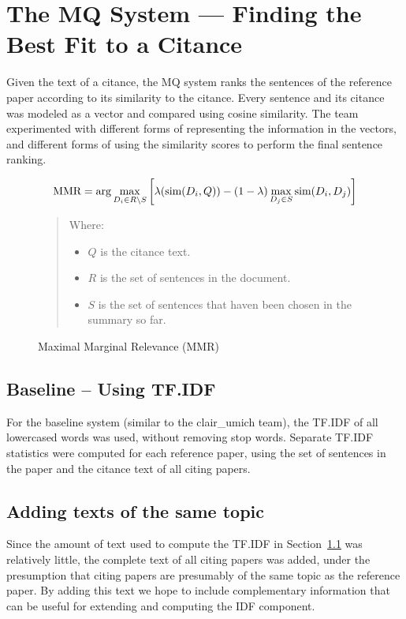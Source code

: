 \documentclass[11pt]{article}
\begin{document}
\section{The MQ System --- Finding the Best Fit to a Citance}
\label{s:mq}
Given the text of a citance, the MQ system ranks the sentences of the 
reference paper according to its similarity to the citance. Every sentence 
and its citance was modeled as a vector and compared using cosine similarity. 
The team experimented with different forms of representing the information in 
the vectors, and different forms of using the similarity scores to perform the 
final sentence ranking.

\begin{figure*}
$$
\hbox{MMR} = \arg\max_{D_i\in R\setminus S}\left[\lambda(\hbox{sim}(D_i,Q)) -
(1-\lambda) \max_{D_j\in S} \hbox{sim}(D_i,D_j)\right]
$$  
\begin{quote}
Where:
\begin{itemize}
\item $Q$ is the citance text.
\item $R$ is the set of sentences in the document.
\item $S$ is the set of sentences that haven been chosen in the
  summary so far.  
\end{itemize}
\end{quote}
  \caption{Maximal Marginal Relevance (MMR)}
  \label{fig:mmr}
\end{figure*}

\subsection{Baseline -- Using TF.IDF}
\label{sec:tfidf}
For the baseline system (similar to the clair\_umich team), the TF.IDF
of all lowercased words was used, without removing stop
words. Separate TF.IDF statistics were computed for each reference
paper, using the set of sentences in the paper and the citance text of
all citing papers.

\subsection{Adding texts of the same topic}
\label{sec:topics}
Since the amount of text used to compute the TF.IDF in
Section~\ref{sec:tfidf} was relatively little, the complete text of
all citing papers was added, under the presumption that citing papers
are presumably of the same topic as the reference paper. By adding
this text we hope to include complementary information that can be
useful for extending and computing the IDF component.
\end{document}
